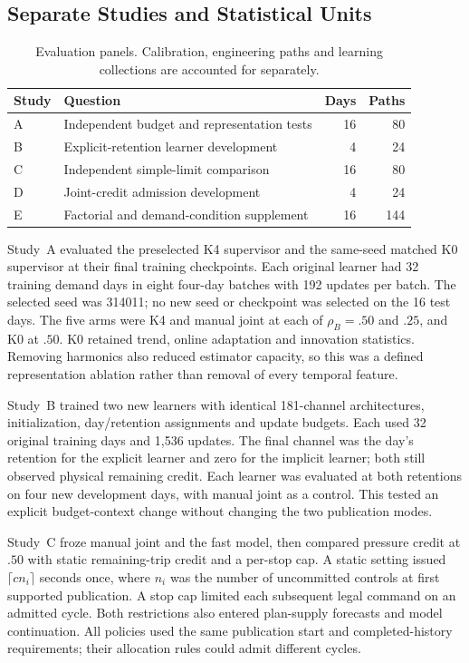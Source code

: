\subsection{Separate Studies and Statistical Units}
\begin{table}[t]
\centering\footnotesize
\caption{Evaluation panels. Calibration, engineering paths and learning collections are accounted for separately.}
\label{tab:panels}
\begin{tabularx}{\columnwidth}{@{}lYrr@{}}
\toprule
Study & Question & Days & Paths\\
\midrule
A & Independent budget and representation tests & 16 & 80\\
B & Explicit-retention learner development & 4 & 24\\
C & Independent simple-limit comparison & 16 & 80\\
D & Joint-credit admission development & 4 & 24\\
E & Factorial and demand-condition supplement & 16 & 144\\
\bottomrule
\end{tabularx}
\end{table}

Study~A evaluated the preselected K4 supervisor and the same-seed matched K0 supervisor at their final training checkpoints. Each original learner had 32 training demand days in eight four-day batches with 192 updates per batch. The selected seed was 314011; no new seed or checkpoint was selected on the 16 test days. The five arms were K4 and manual joint at each of $\rho_B=.50$ and $.25$, and K0 at $.50$. K0 retained trend, online adaptation and innovation statistics. Removing harmonics also reduced estimator capacity, so this was a defined representation ablation rather than removal of every temporal feature.

Study~B trained two new learners with identical 181-channel architectures, initialization, day/retention assignments and update budgets. Each used 32 original training days and 1,536 updates. The final channel was the day's retention for the explicit learner and zero for the implicit learner; both still observed physical remaining credit. Each learner was evaluated at both retentions on four new development days, with manual joint as a control. This tested an explicit budget-context change without changing the two publication modes.

Study~C froze manual joint and the fast model, then compared pressure credit at $.50$ with static remaining-trip credit and a per-stop cap. A static setting issued $\lceil c n_i\rceil$ seconds once, where $n_i$ was the number of uncommitted controls at first supported publication. A stop cap limited each subsequent legal command on an admitted cycle. Both restrictions also entered plan-supply forecasts and model continuation. All policies used the same publication start and completed-history requirements; their allocation rules could admit different cycles.

